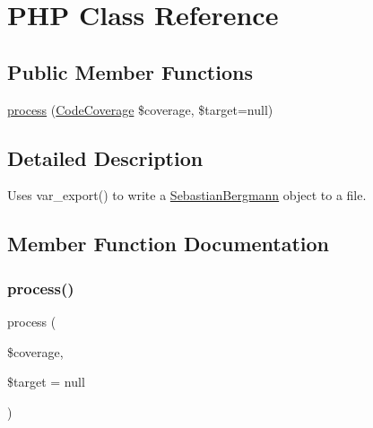 \hypertarget{class_sebastian_bergmann_1_1_code_coverage_1_1_report_1_1_p_h_p}{}\section{P\+HP Class Reference}
\label{class_sebastian_bergmann_1_1_code_coverage_1_1_report_1_1_p_h_p}
\subsection*{Public Member Functions}
\begin{DoxyCompactItemize}
\item 
\mbox{\hyperlink{class_sebastian_bergmann_1_1_code_coverage_1_1_report_1_1_p_h_p_a8ea3327ba2588add449a83367e5a7141}{process}} (\mbox{\hyperlink{class_sebastian_bergmann_1_1_code_coverage_1_1_code_coverage}{Code\+Coverage}} \$coverage, \$target=null)
\end{DoxyCompactItemize}


\subsection{Detailed Description}
Uses var\+\_\+export() to write a \mbox{\hyperlink{namespace_sebastian_bergmann}{Sebastian\+Bergmann}} object to a file. 

\subsection{Member Function Documentation}
\mbox{\label{class_sebastian_bergmann_1_1_code_coverage_1_1_report_1_1_p_h_p_a8ea3327ba2588add449a83367e5a7141}} 
\subsubsection{\texorpdfstring{process()}{process()}}
{\footnotesize\ttfamily process (\begin{DoxyParamCaption}\item[{\mbox{\hyperlink{class_sebastian_bergmann_1_1_code_coverage_1_1_code_coverage}{Code\+Coverage}}}]{\$coverage,  }\item[{}]{\$target = {\ttfamily null} }\end{DoxyParamCaption})}


